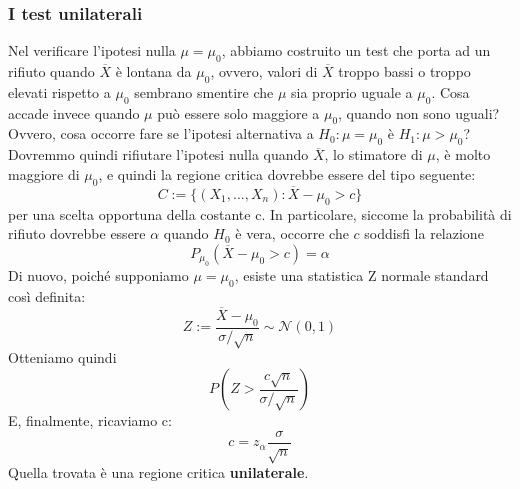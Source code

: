 \documentclass[11pt]{article}
\begin{document}
\subsubsection{I test unilaterali}
Nel verificare l'ipotesi nulla $\mu=\mu_0$, abbiamo costruito un test che porta ad un rifiuto quando $\overline{X}$ è lontana da $\mu_0$, ovvero, valori di $\overline{X}$ troppo bassi o troppo elevati rispetto a $\mu_0$ sembrano smentire che $\mu$ sia proprio uguale a $\mu_0$. Cosa accade invece quando $\mu$ può essere solo maggiore a $\mu_0$, quando non sono uguali? Ovvero, cosa occorre fare se l'ipotesi alternativa a $H_0 : \mu = \mu_0$ è $H_1:\mu>\mu_0$? Dovremmo quindi rifiutare l'ipotesi nulla quando $\overline{X}$, lo stimatore di $\mu$, è molto maggiore di $\mu_0$, e quindi la regione critica dovrebbe essere del tipo seguente:
\begin{displaymath}
    C := \{(X_1,...,X_n):\overline{X}-\mu_0 >c \}
\end{displaymath}
per una scelta opportuna della costante c. In particolare, siccome la probabilità di rifiuto dovrebbe essere $\alpha$ quando $H_0$ è vera, occorre che $c$ soddisfi la relazione
\begin{displaymath}
    P_{\mu_0}(\overline{X}-\mu_0 >c) = \alpha
\end{displaymath}
Di nuovo, poiché supponiamo $\mu = \mu_0$, esiste una statistica Z normale standard così definita:
\begin{displaymath}
    Z:=\frac{\overline{X}- \mu_0}{\sigma/\sqrt{n}} \sim \mathcal{N}(0,1)
\end{displaymath}
Otteniamo quindi
\begin{displaymath}
    P\left(Z >  \frac{c\sqrt{n}}{\sigma/\sqrt{n}}\right)
\end{displaymath}
E, finalmente, ricaviamo c:
\begin{displaymath}
    c=z_\alpha\frac{\sigma}{\sqrt{n}}
\end{displaymath}
Quella trovata è una regione critica \textbf{unilaterale}.
\end{document}
